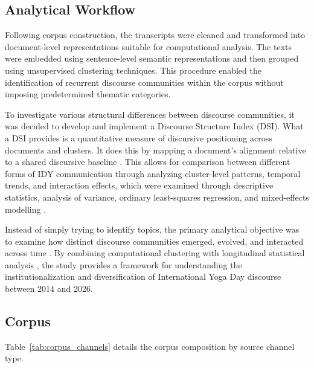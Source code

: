 \documentclass[11pt]{article}
\begin{document}
\subsection{Analytical Workflow}

Following corpus construction, the transcripts were cleaned and transformed into document-level representations suitable for computational analysis. The texts were embedded using sentence-level semantic representations and then grouped using unsupervised clustering techniques. This procedure enabled the identification of recurrent discourse communities within the corpus without imposing predetermined thematic categories.

To investigate various structural differences between discourse communities, it was decided to develop and implement a Discourse Structure Index (DSI). What a DSI provides is a quantitative measure of discursive positioning across documents and clusters. It does this by mapping  a document's alignment relative to a shared discursive baseline \cite{paranyushkin2019,thimmanayakanapalya2025}. This allows for comparison between different forms of IDY communication through analyzing cluster-level patterns, temporal trends, and interaction effects, which were examined through descriptive statistics, analysis of variance, ordinary least-squares regression, and mixed-effects modelling \cite{gries2015,speelman2018}.

Instead of simply trying to identify topics, the primary analytical objective was to examine how distinct discourse communities emerged, evolved, and interacted across time \cite{brigadir2015,winter2016,desiderio2025}. By combining computational clustering with longitudinal statistical analysis \cite{teuling2025,huang2025}, the study provides a framework for understanding the institutionalization and diversification of International Yoga Day discourse between 2014 and 2026.

\subsection{Corpus}

Table~\ref{tab:corpus_channels} details the corpus composition by source channel type.
\end{document}
